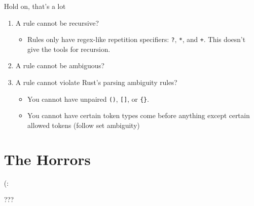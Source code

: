 \documentclass{beamer}
\begin{document}
	\begin{frame}{Hold on, that's a lot}
		\begin{enumerate}
			\item A rule cannot be recursive?
			\pause
			\begin{itemize}
				\item Rules only have regex-like repetition specifiers: \texttt{?}, \texttt{*}, and
				\texttt{+}. This doesn't give the tools for recursion.
			\end{itemize}

			\pause

			\item A rule cannot be ambiguous?
			\pause

			\pause

			\item A rule cannot violate Rust's parsing ambiguity rules?
			\pause
			\begin{itemize}
				\item You cannot have unpaired \texttt{()}, \texttt{[]}, or \texttt{\{\}}.
				\item You cannot have certain token types come before anything except certain allowed
				tokens (follow set ambiguity)
			\end{itemize}
		\end{enumerate}
	\end{frame}

	\section*{The Horrors}
	\begin{frame}{(:}
		\centering
		
	\end{frame}

	\begin{frame}{???}
		\centering
		
	\end{frame}
\end{document}
